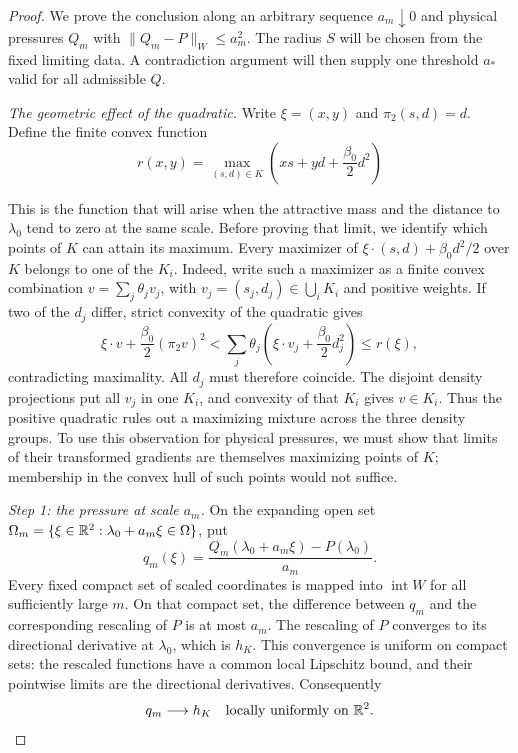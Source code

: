 \begin{proof}
We prove the conclusion along an arbitrary sequence $a_m\downarrow0$
and physical pressures $Q_m$ with
$\|Q_m-P\|_W\leq a_m^2$. The radius $S$ will be chosen from the fixed
limiting data. A contradiction argument will then supply one threshold
$a_*$ valid for all admissible $Q$.

\smallskip
\noindent\textit{The geometric effect of the quadratic.}
Write $\xi=(x,y)$ and $\pi_2(s,d)=d$. Define the finite convex function
\begin{equation}
 r(x,y)=\max_{(s,d)\in K}
       \left(xs+yd+\frac{\beta_0}{2}d^2\right)
 \label{eq:scaled-transform-limit-definition}
\end{equation}

This is the function that will arise when the attractive mass and the
distance to $\lambda_0$ tend to zero at the same scale. Before proving that
limit, we identify which points of $K$ can attain its maximum.
Every maximizer of
$\xi\cdot(s,d)+\beta_0d^2/2$ over $K$ belongs to one of the $K_i$.
Indeed, write such a maximizer as a finite convex combination
$v=\sum_j\theta_jv_j$, with $v_j=(s_j,d_j)\in\bigcup_iK_i$ and
positive weights. If two of the $d_j$ differ, strict convexity of the
quadratic gives
\[
 \xi\cdot v+\frac{\beta_0}{2}(\pi_2v)^2
   <\sum_j\theta_j\left(\xi\cdot v_j+
                                      \frac{\beta_0}{2}d_j^2\right)
   \leq r(\xi),
\]
contradicting maximality. All $d_j$ must therefore coincide. The disjoint
density projections put all $v_j$ in one $K_i$, and convexity of that
$K_i$ gives $v\in K_i$. 
Thus the positive quadratic rules out a maximizing mixture across the three
density groups. To use this observation for physical pressures, we must show
that limits of their transformed gradients are themselves maximizing points
of $K$; membership in the convex hull of such points would not suffice.

\smallskip
\noindent\textit{Step 1: the pressure at scale $a_m$.}
On the expanding open set
$\Omega_m=\{\xi\in\mathbb R^2:\lambda_0+a_m\xi\in\Omega\}$, put
\begin{equation}
 q_m(\xi)=
 \frac{Q_m(\lambda_0+a_m\xi)-P(\lambda_0)}{a_m}.
 \label{eq:scaled-pressure}
\end{equation}
Every fixed compact set of scaled coordinates is mapped into
$\operatorname{int}W$ for all sufficiently large $m$. On that compact
set, the difference between $q_m$ and the corresponding rescaling of $P$
is at most $a_m$. The rescaling of $P$ converges to its directional
derivative at $\lambda_0$, which is $h_K$. This convergence is uniform
on compact sets: the rescaled functions have a common local Lipschitz
bound, and their pointwise limits are the directional derivatives.
Consequently
\begin{equation}
 q_m\longrightarrow h_K
 \quad\text{locally uniformly on }\mathbb R^2.
 \label{eq:scaled-pressure-limit}
\end{equation}


\end{proof}
